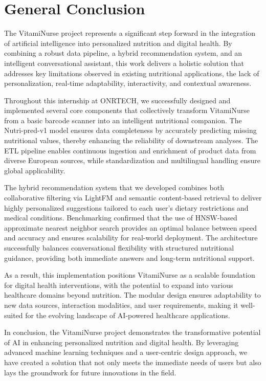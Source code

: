 \chapter*{General Conclusion}
The VitamiNurse project represents a significant step forward in the integration of artificial intelligence into personalized nutrition and digital health. 
By combining a robust data pipeline, 
a hybrid recommendation system, and an intelligent conversational assistant, this work delivers a holistic solution that addresses key limitations observed 
in existing nutritional applications, the lack of personalization, real-time adaptability, interactivity, and contextual awareness. 

Throughout this internship at ONRTECH, we successfully designed and implemented several core components that collectively transform VitamiNurse from a basic 
barcode scanner into an intelligent nutritional companion. The Nutri-pred-v1 model ensures data completeness by accurately predicting missing nutritional values, 
thereby enhancing the reliability of downstream analyses. The ETL pipeline enables continuous ingestion and enrichment of product data from diverse European sources, 
while standardization and multilingual handling ensure global applicability. 

The hybrid recommendation system that we developed combines both collaborative filtering via LightFM and semantic content-based retrieval to deliver highly personalized suggestions tailored to each user’s dietary restrictions and medical conditions. 
Benchmarking confirmed that the use of HNSW-based approximate nearest neighbor search provides an optimal balance between speed and accuracy and  ensures scalability for real-world deployment. 
The architecture successfully balances conversational flexibility with structured nutritional guidance, providing both immediate answers and long-term nutritional support.

As a result, this implementation positions VitamiNurse as a scalable foundation for digital health interventions, with the potential to expand into various healthcare domains beyond nutrition. 
The modular design ensures adaptability to new data sources, interaction modalities, and user requirements, making it well-suited for the evolving landscape of AI-powered healthcare applications.

In conclusion, the VitamiNurse project demonstrates the transformative potential of AI in enhancing personalized nutrition and digital health. By leveraging advanced machine learning techniques and a user-centric design approach, we have created a solution that not only meets the immediate needs of users but also lays the groundwork for future innovations in the field.